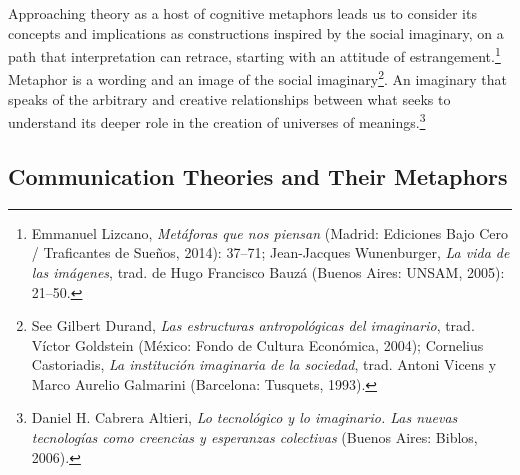 \documentclass{tufte-handout}
\begin{document}
Approaching theory as a host of cognitive metaphors leads us to consider
its concepts and implications as constructions inspired by the social
imaginary, on a path that interpretation can retrace, starting with an
attitude of estrangement.\footnote{Emmanuel Lizcano, \emph{Metáforas que
  nos piensan} (Madrid: Ediciones Bajo Cero / Traficantes de Sueños,
  2014): 37--71; Jean-Jacques Wunenburger, \emph{La vida de las
  imágenes}, trad. de Hugo Francisco Bauzá (Buenos Aires: UNSAM, 2005):
  21--50.} Metaphor is a wording and an image of the social
imaginary\footnote{See Gilbert Durand, \emph{Las estructuras
  antropológicas del imaginario}, trad. Víctor Goldstein (México: Fondo
  de Cultura Económica, 2004); Cornelius Castoriadis, \emph{La
  institución imaginaria de la sociedad}, trad. Antoni Vicens y Marco
  Aurelio Galmarini (Barcelona: Tusquets, 1993).}. An imaginary that
speaks of the arbitrary and creative relationships between what seeks to
understand its deeper role in the creation of universes of
meanings.\footnote{Daniel H. Cabrera Altieri, \emph{Lo tecnológico y lo
  imaginario. Las nuevas tecnologías como creencias y esperanzas
  colectivas} (Buenos Aires: Biblos, 2006).}

\hypertarget{communication-theories-and-their-metaphors}{%
\subsection{Communication Theories and Their
Metaphors}\label{communication-theories-and-their-metaphors}}
\end{document}
